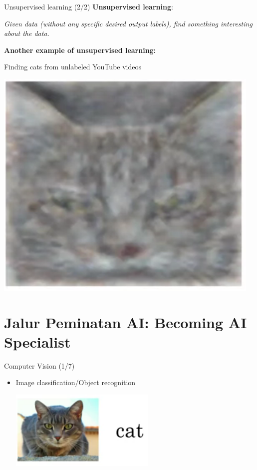 \documentclass[pdf]{beamer}
\theoremstyle{mystyle}
\begin{document}
\begin{frame}{Unsupervised learning (2/2)}
	\textbf{Unsupervised learning}:
	\begin{center}
		\textit{Given data (without any specific desired output labels), find something interesting about the data.}
	\end{center}
	
	\textbf{Another example of unsupervised learning:}
	
	\bigskip	
	
	\pause Finding cats from unlabeled YouTube videos
	\begin{center}
		\includegraphics[scale=.25]{google-cats}
	\end{center}	
\end{frame}

\section{Jalur Peminatan AI: Becoming AI Specialist}
\begin{frame}{Computer Vision (1/7)}
	\begin{itemize}
		\item Image classification/Object recognition 
		\begin{center}
			\includegraphics[scale=.4]{image-classification}	
		\end{center}
	\end{itemize}
\end{frame}
\end{document}
